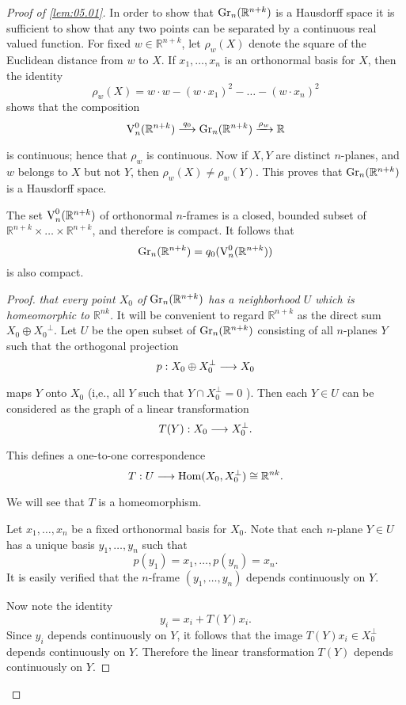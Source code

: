 \documentclass[../main]{subfiles}
\begin{document}
\begin{proof}[Proof of \ref{lem:05.01}]
	In order to show that $\operatorname{Gr}_n (\mathbb{R}^{n+k})$ is a Hausdorff space it is sufficient to show that any two points can be separated by a continuous real valued function. For fixed $w \in \mathbb{R}^{n+k}$, let $\rho_{w}(X)$ denote the square of the Euclidean distance from $w$ to $X$. If $x_{1}, \dots, x_{n}$ is an orthonormal basis for $X$, then the identity
	$$
	\rho_{w}(X)=w \cdot w-(w \cdot x_{1})^{2}-\dots-(w \cdot x_{n})^{2}
	$$
	shows that the composition
	\[
	\StiefelManifold_n^0(\mathbb{R}^{n+k}) \varrightarrow{q_0}\grassmannian_n (\mathbb{R}^{n+k}) \varrightarrow{\rho_w}  \mathbb{R}
	\]
is continuous; hence that $\rho_{w}$ is continuous. Now if $X, Y$ are distinct $n$-planes, and $w$ belongs to $X$ but not $Y$, then $\rho_{w}(X) \neq \rho_{w}(Y)$. This proves that $\operatorname{Gr}_n (\mathbb{R}^{n+k})$ is a Hausdorff space.

The set $\operatorname{V}_n^0(\mathbb{R}^{n+k})$ of orthonormal $n$-frames is a closed, bounded subset of $\mathbb{R}^{n+k} \times \dots \times \mathbb{R}^{n+k}$, and therefore is compact. It follows that
\[\operatorname{Gr}_n (\mathbb{R}^{n+k})=q_{0}(\operatorname{V}_n^0(\mathbb{R}^{n+k}))\]
is also compact.\\
\begin{proof}\textit{that every point $X_{0}$ of $\operatorname{Gr}_n (\mathbb{R}^{n+k})$ has a neighborhood $U$ which is homeomorphic to $\mathbb{R}^{nk}$.}
 It will be convenient to regard $\mathbb{R}^{n+k}$ as the direct sum $X_{0} \oplus X_{0}{ }^\perp$. Let $U$ be the open subset of $\operatorname{Gr}_n (\mathbb{R}^{n+k})$ consisting of all $n$-planes $Y$ such that the orthogonal projection
\[p:X_0\oplus X_{0}^{\perp}\varrightarrow{}X_0\]
maps $Y$ onto $X_{0}$ (i,e., all $Y$ such that $Y \cap X_{0}^{\perp}=0$ ). Then each $Y \in U$ can be considered as the graph of a linear transformation
\[T(Y):X_{0}\varrightarrow{}X_{0}^{\perp}.\]
This defines a one-to-one correspondence
\[T:U \varrightarrow{}\Hom(X_0,X_{0}^{\perp})\cong\mathbb{R}^{nk}.\]
We will see that $T$ is a homeomorphism.

Let $x_{1}, \dots, x_{n}$ be a fixed orthonormal basis for $X_{0}$. Note that each $n$-plane $Y \in U$ has a unique basis $y_{1}, \dots, y_{n}$ such that
\[p(y_{1})=x_{1}, \dots, p(y_{n})=x_{n}.\]
It is easily verified that the $n$-frame $(y_{1}, \dots, y_{n})$ depends continuously on $Y$.

Now note the identity
\[y_{i}=x_{i}+T(Y) x_{i}.\]
Since $y_i$ depends continuously on $Y$, it follows that the image
$T(Y)x_i\in X_0^\perp$ depends continuously on $Y$. Therefore the linear 
transformation $T(Y)$ depends continuously on $Y$.


\end{proof}
\end{proof}
\end{document}
